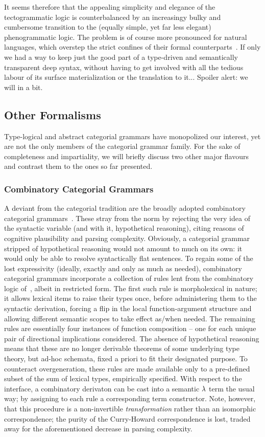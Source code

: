 It seems therefore that the appealing simplicity and elegance of the tectogrammatic logic is counterbalanced by an increasingy bulky and cumbersome transition to the (equally simple, yet far less elegant) phenogrammatic logic.
The problem is of course more pronounced for natural languages, which overstep the strict confines of their formal counterparts~\cite{moot2014hybrid}.
If only we had a way to keep just the good part of a type-driven and semantically transparent deep syntax, without having to get involved with all the tedious labour of its surface materialization or the translation to it...
Spoiler alert: we will in a bit.

\subsection{Other Formalisms}
Type-logical and abstract categorial grammars have monopolized our interest, yet are not the only members of the categorial grammar family.
For the sake of completeness and impartiality, we will briefly discuss two other major flavours and contrast them to the ones so far presented.

\subsubsection{Combinatory Categorial Grammars}
A deviant from the categorial tradition are the broadly adopted combinatory categorial grammars~\cite{ades1982order,szabolcsi1989bound, steedman2022combinatory}.
These stray from the norm by rejecting the very idea of the syntactic variable (and with it, hypothetical reasoning), citing reasons of cognitive plausibility and parsing complexity.
Obviously, a categorial grammar stripped of hypothetical reasoning would not amount to much on its own: it would only be able to resolve syntactically flat sentences.
To regain some of the lost expressivity (ideally, exactly and only as much as needed), combinatory categorial grammars incorporate a collection of rules lent from the combinatory logic of~\citet{curry1958combinatory}, albeit in restricted form.
The first such rule is morpholexical in nature; it allows lexical items to raise their types once, before administering them to the syntactic derivation, forcing a flip in the local function-argument structure and allowing different semantic scopes to take effect as/when needed.
The remaining rules are essentially four instances of function composition -- one for each unique pair of directional implications considered.
The absence of hypothetical reasoning means that these are no longer derivable theorems of some underlying type theory, but ad-hoc schemata, fixed a priori to fit their designated purpose.
To counteract overgeneration, these rules are made available only to a pre-defined subset of the sum of lexical types, empirically specified.
With respect to the interface, a combinatory derivaton can be cast into a semantic $\mathnormal{\lambda}$ term the usual way; by assigning to each rule a corresponding term constructor.
Note, however, that this procedure is a non-invertible \textit{transformation} rather than an isomorphic correspondence; the purity of the Curry-Howard correspondence is lost, traded away for the aforementioned decrease in parsing complexity.

